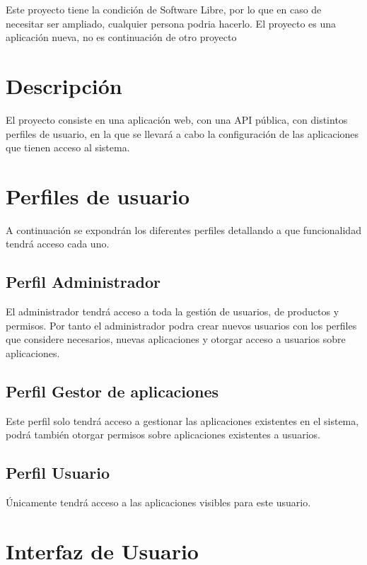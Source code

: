 \documentclass[12pt,a4paperpaper,]{report}
\begin{document}
Este proyecto tiene la condición de Software Libre, por lo que en caso
de necesitar ser ampliado, cualquier persona podria hacerlo. El proyecto
es una aplicación nueva, no es continuación de otro proyecto

\section{Descripción}\label{descripciuxf3n}

El proyecto consiste en una aplicación web, con una API pública, con
distintos perfiles de usuario, en la que se llevará a cabo la
configuración de las aplicaciones que tienen acceso al sistema.

\section{Perfiles de usuario}\label{perfiles-de-usuario}

A continuación se expondrán los diferentes perfiles detallando a que
funcionalidad tendrá acceso cada uno.

\subsection{Perfil Administrador}\label{perfil-administrador}

El administrador tendrá acceso a toda la gestión de usuarios, de
productos y permisos. Por tanto el administrador podra crear nuevos
usuarios con los perfiles que considere necesarios, nuevas aplicaciones
y otorgar acceso a usuarios sobre aplicaciones.

\subsection{Perfil Gestor de
aplicaciones}\label{perfil-gestor-de-aplicaciones}

Este perfil solo tendrá acceso a gestionar las aplicaciones existentes
en el sistema, podrá también otorgar permisos sobre aplicaciones
existentes a usuarios.

\subsection{Perfil Usuario}\label{perfil-usuario}

Únicamente tendrá acceso a las aplicaciones visibles para este usuario.

\section{Interfaz de Usuario}\label{interfaz-de-usuario}
\end{document}
